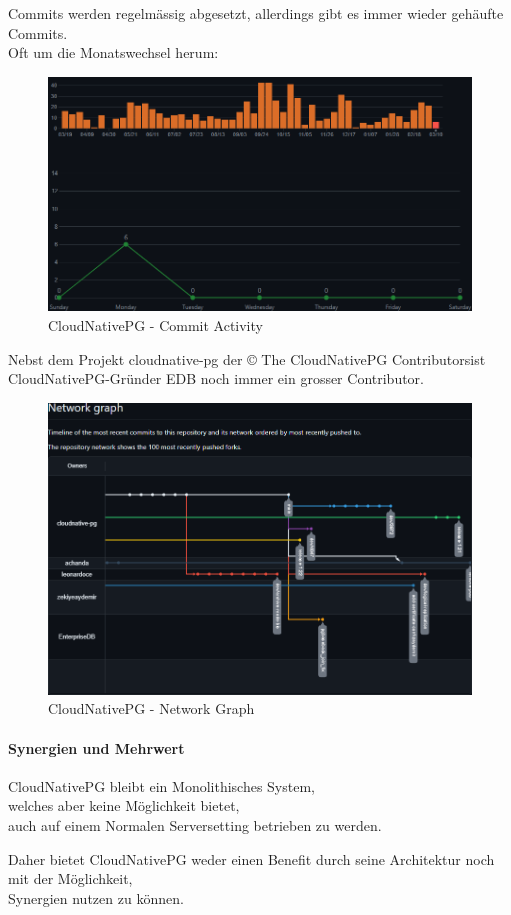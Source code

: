 \begin{flushleft}
    Commits werden regelmässig abgesetzt, allerdings gibt es immer wieder gehäufte Commits.\\
    Oft um die Monatswechsel herum:
    \begin{figure}[H]
        \centering
        \includegraphics[width=0.75\linewidth]{source/implementation/evaluation/postgresql_ha_solutions/insights/cloudnativepg/commit_activity_cloudnative-pg_cloudnative-pg}
        \caption{CloudNativePG - Commit Activity}
        \label{fig:commit_activity_cloudnative-pg_cloudnative-pg}
    \end{figure}

    Nebst dem Projekt cloudnative-pg der \guillemotleft© The CloudNativePG Contributors\guillemotright ist CloudNativePG-Gründer EDB noch immer ein grosser Contributor.
     \begin{figure}[H]
        \centering
        \includegraphics[width=0.75\linewidth]{source/implementation/evaluation/postgresql_ha_solutions/insights/cloudnativepg/network_graph_cloudnative-pg_cloudnative-pg}
        \caption{CloudNativePG - Network Graph}
        \label{fig:network_graph_cloudnative-pg_cloudnative-pg}
    \end{figure}
\end{flushleft}
\begin{flushleft}
    \paragraph{Synergien und Mehrwert}
    CloudNativePG bleibt ein Monolithisches System,\\welches aber keine Möglichkeit bietet,\\auch auf einem Normalen Serversetting betrieben zu werden.
\end{flushleft}
\begin{flushleft}
    Daher bietet CloudNativePG weder einen Benefit durch seine Architektur noch mit der Möglichkeit,\\Synergien nutzen zu können.
\end{flushleft}